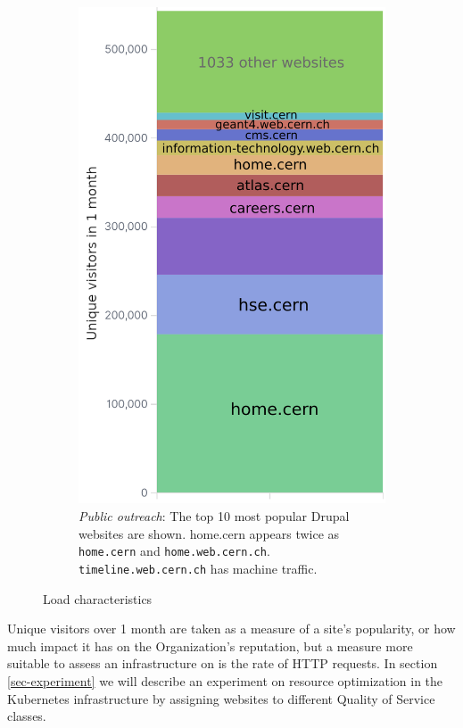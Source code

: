 \begin{figure}[t]
\begin{subfigure}[b]{.25\textwidth}
    \includegraphics[width=\textwidth]{figures/drupal-top10-uniqClientIP.png}
    \caption{\emph{Public outreach}: 
        The top 10 most popular Drupal websites are shown.
        home.cern appears twice as \texttt{home.cern} and \texttt{home.web.cern.ch}.
        {\color{amethyst} \texttt{timeline.web.cern.ch}} has machine traffic.}
    \label{fig-drp-top10-cip}
    \end{subfigure}
    \vspace{-1.8em}
    \caption{Load characteristics}
    \vspace{-2em}
\end{figure}

Unique visitors over 1 month are taken as a measure of a site's popularity, or how much impact it has on the Organization's reputation,
but a measure more suitable to assess an infrastructure on is the rate of HTTP requests.
In section \ref{sec-experiment} we will describe an experiment on resource optimization in the Kubernetes infrastructure
by assigning websites to different Quality of Service classes.

